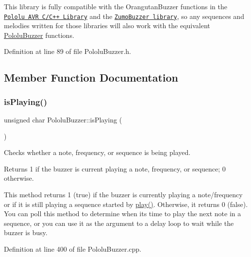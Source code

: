 This library is fully compatible with the Orangutan\+Buzzer functions in the \href{http://www.pololu.com/docs/0J18}{\tt Pololu A\+VR C/\+C++ Library} and the \href{https://github.com/pololu/zumo-shield}{\tt Zumo\+Buzzer library}, so any sequences and melodies written for those libraries will also work with the equivalent \hyperlink{class_pololu_buzzer}{Pololu\+Buzzer} functions. 

Definition at line 89 of file Pololu\+Buzzer.\+h.



\subsection{Member Function Documentation}
\mbox{\label{class_pololu_buzzer_a8045fdf0a144e0b71a5b223a0ef34027}} 
\subsubsection{\texorpdfstring{is\+Playing()}{isPlaying()}}
{\footnotesize\ttfamily unsigned char Pololu\+Buzzer\+::is\+Playing (\begin{DoxyParamCaption}{ }\end{DoxyParamCaption})\hspace{0.3cm}{\ttfamily [static]}}



Checks whether a note, frequency, or sequence is being played. 

\begin{DoxyReturn}{Returns}
1 if the buzzer is current playing a note, frequency, or sequence; 0 otherwise.
\end{DoxyReturn}
This method returns 1 (true) if the buzzer is currently playing a note/frequency or if it is still playing a sequence started by {\ttfamily \hyperlink{class_pololu_buzzer_a22f45ef7cdf9dc8fc54e617244368277}{play()}}. Otherwise, it returns 0 (false). You can poll this method to determine when it\textquotesingle{}s time to play the next note in a sequence, or you can use it as the argument to a delay loop to wait while the buzzer is busy. 

Definition at line 400 of file Pololu\+Buzzer.\+cpp.

\mbox{\label{class_pololu_buzzer_a22f45ef7cdf9dc8fc54e617244368277}} 
